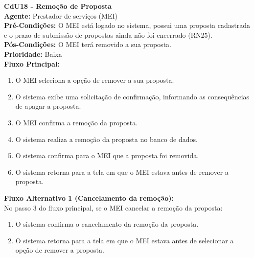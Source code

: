 

\vspace{7pt}
\noindent\textbf{\normalsize CdU18 - Remoção de Proposta}\\
\noindent\textbf{Agente:} Prestador de serviços (MEI)\\ 
\textbf{Pré-Condições:} O MEI está logado no sistema, possui uma proposta cadastrada e o prazo de submissão de propostas ainda não foi encerrado (RN25).\\ 
\textbf{Pós-Condições:} O MEI terá removido a sua proposta.\\
\textbf{Prioridade:} Baixa \vspace{3pt}\\
\noindent\textbf{Fluxo Principal:}
\begin{enumerate}[noitemsep, topsep=-5pt, parsep=0pt]
    \item O MEI seleciona a opção de remover a sua proposta.
    \item O sistema exibe uma solicitação de confirmação, informando as consequências de apagar a proposta.
    \item O MEI confirma a remoção da proposta.
    \item O sistema realiza a remoção da proposta no banco de dados.
    \item O sistema confirma para o MEI que a proposta foi removida.
    \item O sistema retorna para a tela em que o MEI estava antes de remover a proposta.
\end{enumerate}

\noindent\textbf{Fluxo Alternativo 1 (Cancelamento da remoção):}\\
No passo 3 do fluxo principal, se o MEI cancelar a remoção da proposta:
\begin{enumerate}[noitemsep, topsep=-5pt, parsep=0pt]
    \item O sistema confirma o cancelamento da remoção da proposta.
    \item O sistema retorna para a tela em que o MEI estava antes de selecionar a opção de remover a proposta.
\end{enumerate}



